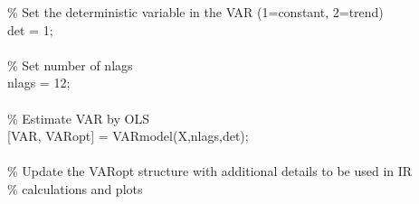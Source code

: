 \hspace{1mm}\hspace{5mm} \hspace{5mm} \textcolor{matlabgreen}{\% Set the deterministic variable in the VAR (1=constant, 2=trend) }\\ 
\hspace{1mm}\hspace{5mm} \hspace{5mm} det = 1; \\ 
\hspace{1mm}\hspace{5mm} \hspace{5mm}  \\ 
\hspace{1mm}\hspace{5mm} \hspace{5mm} \textcolor{matlabgreen}{\% Set number of nlags }\\ 
\hspace{1mm}\hspace{5mm} \hspace{5mm} nlags = 12; \\ 
\hspace{1mm}\hspace{5mm} \hspace{5mm}  \\ 
\hspace{1mm}\hspace{5mm} \hspace{5mm} \textcolor{matlabgreen}{\% Estimate VAR by OLS }\\ 
\hspace{1mm}\hspace{5mm} \hspace{5mm} [VAR, VARopt] = VARmodel(X,nlags,det); \\ 
\hspace{1mm}\hspace{5mm} \hspace{5mm}  \\ 
\hspace{1mm}\hspace{5mm} \hspace{5mm} \textcolor{matlabgreen}{\% Update the VARopt structure with additional details to be used in IR  }\\ 
\hspace{1mm}\hspace{5mm} \hspace{5mm} \textcolor{matlabgreen}{\% calculations and plots }\\ 
